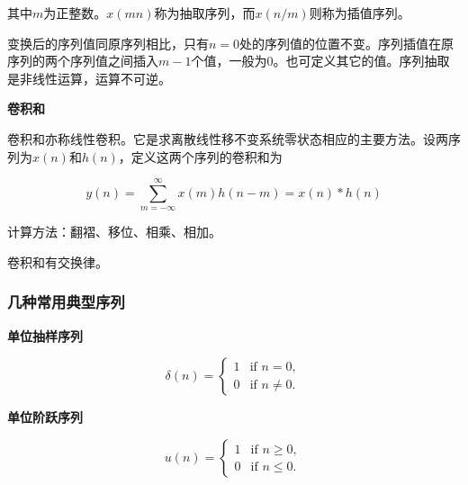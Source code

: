 \documentclass[cn, hazy, blue, normal, 12pt]{elegantnote}
\begin{document}
其中$m$为正整数。$x(mn)$称为抽取序列，而$x(n/m)$则称为插值序列。

变换后的序列值同原序列相比，只有$n=0$处的序列值的位置不变。序列插值在原序列的两个序列值之间插入$m-1$个值，一般为$0$。也可定义其它的值。序列抽取是非线性运算，运算不可逆。

\textbf{卷积和}

卷积和亦称线性卷积。它是求离散线性移不变系统零状态相应的主要方法。设两序列为$x(n)$和$h(n)$，定义这两个序列的卷积和为

\begin{equation}
        y(n)=\sum_{m=-\infty}^{\infty}{x(m)h(n-m)}=x(n)\ast h(n)
\end{equation}

计算方法：翻褶、移位、相乘、相加。

卷积和有交换律。

\subsubsection{几种常用典型序列}

\textbf{单位抽样序列}

\begin{equation}
        \delta(n)= \left\{
        \begin{array}{rl}
        1 & \text{if } n = 0,\\
        0 & \text{if } n \neq 0.
        \end{array}
        \right.
\end{equation}

\begin{center}
\end{center}

\textbf{单位阶跃序列}

\begin{equation}
        u(n)= \left\{
        \begin{array}{rl}
        1 & \text{if } n \geq 0,\\
        0 & \text{if } n \leq 0.
        \end{array}
        \right.
\end{equation}
\end{document}

